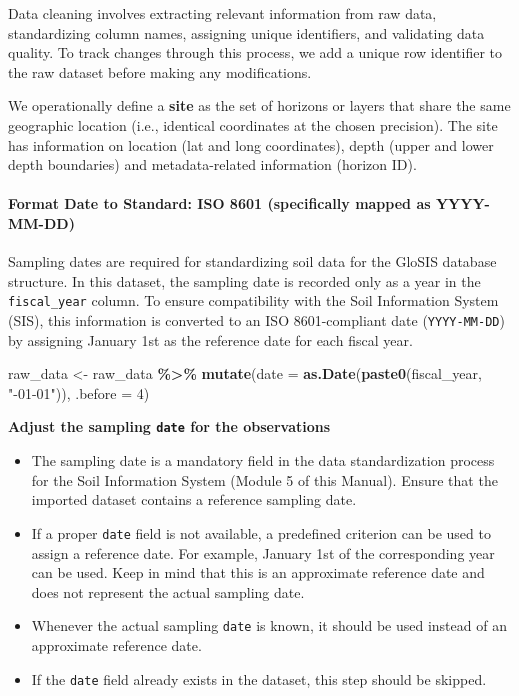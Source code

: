 \documentclass[
  10pt,
  b5paper,
  oneside]{book}
\newenvironment{Shaded}{\begin{snugshade}}{\end{snugshade}}
\newcommand{\AttributeTok}[1]{\textcolor[rgb]{0.13,0.29,0.53}{#1}}
\newcommand{\DecValTok}[1]{\textcolor[rgb]{0.00,0.00,0.81}{#1}}
\newcommand{\FunctionTok}[1]{\textcolor[rgb]{0.13,0.29,0.53}{\textbf{#1}}}
\newcommand{\NormalTok}[1]{#1}
\newcommand{\OtherTok}[1]{\textcolor[rgb]{0.56,0.35,0.01}{#1}}
\newcommand{\SpecialCharTok}[1]{\textcolor[rgb]{0.81,0.36,0.00}{\textbf{#1}}}
\newcommand{\StringTok}[1]{\textcolor[rgb]{0.31,0.60,0.02}{#1}}
\begin{document}
Data cleaning involves extracting relevant information from raw data, standardizing column names, assigning unique identifiers, and validating data quality. To track changes through this process, we add a unique row identifier to the raw dataset before making any modifications.

We operationally define a \textbf{site} as the set of horizons or layers that share the same geographic location (i.e., identical coordinates at the chosen precision). The site has information on location (lat and long coordinates), depth (upper and lower depth boundaries) and metadata-related information (horizon ID).

\paragraph{Format Date to Standard: ISO 8601 (specifically mapped as YYYY-MM-DD)}\label{format-date-to-standard-iso-8601-specifically-mapped-as-yyyy-mm-dd}

Sampling dates are required for standardizing soil data for the GloSIS database structure. In this dataset, the sampling date is recorded only as a year in the \texttt{fiscal\_year} column. To ensure compatibility with the Soil Information System (SIS), this information is converted to an ISO 8601-compliant date (\texttt{YYYY-MM-DD}) by assigning January 1st as the reference date for each fiscal year.

\begin{Shaded}
\begin{Highlighting}[]
\NormalTok{raw\_data }\OtherTok{\textless{}{-}}\NormalTok{ raw\_data }\SpecialCharTok{\%\textgreater{}\%}
  \FunctionTok{mutate}\NormalTok{(}\AttributeTok{date =} \FunctionTok{as.Date}\NormalTok{(}\FunctionTok{paste0}\NormalTok{(fiscal\_year, }\StringTok{"{-}01{-}01"}\NormalTok{)), }\AttributeTok{.before =} \DecValTok{4}\NormalTok{)}
\end{Highlighting}
\end{Shaded}

\textbf{Adjust the sampling \texttt{date} for the observations}

\begin{itemize}
\item
  The sampling date is a mandatory field in the data standardization process for the Soil Information System (Module 5 of this Manual). Ensure that the imported dataset contains a reference sampling date.
\item
  If a proper \texttt{date} field is not available, a predefined criterion can be used to assign a reference date. For example, January 1st of the corresponding year can be used. Keep in mind that this is an approximate reference date and does not represent the actual sampling date.
\item
  Whenever the actual sampling \texttt{date} is known, it should be used instead of an approximate reference date.
\item
  If the \texttt{date} field already exists in the dataset, this step should be skipped.
\end{itemize}
\end{document}
